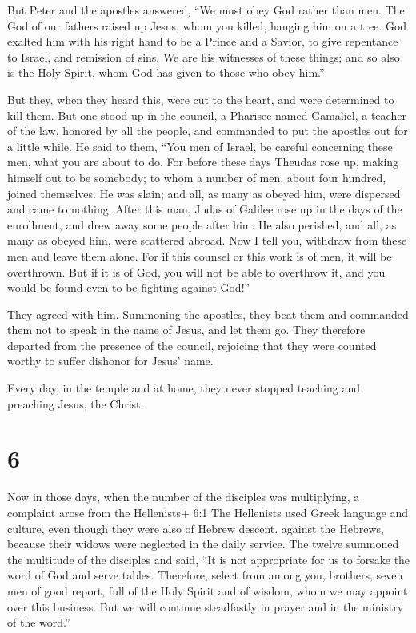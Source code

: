  But Peter and the apostles answered, ``We must obey God
rather than men.  The God of our fathers raised up Jesus,
whom you killed, hanging him on a tree.  God exalted him
with his right hand to be a Prince and a Savior, to give repentance to
Israel, and remission of sins.  We are his witnesses of
these things; and so also is the Holy Spirit, whom God has given to
those who obey him.''

 But they, when they heard this, were cut to the heart, and
were determined to kill them.  But one stood up in the
council, a Pharisee named Gamaliel, a teacher of the law, honored by all
the people, and commanded to put the apostles out for a little while.
 He said to them, ``You men of Israel, be careful
concerning these men, what you are about to do.  For before
these days Theudas rose up, making himself out to be somebody; to whom a
number of men, about four hundred, joined themselves. He was slain; and
all, as many as obeyed him, were dispersed and came to nothing.
 After this man, Judas of Galilee rose up in the days of
the enrollment, and drew away some people after him. He also perished,
and all, as many as obeyed him, were scattered abroad.  Now
I tell you, withdraw from these men and leave them alone. For if this
counsel or this work is of men, it will be overthrown.  But
if it is of God, you will not be able to overthrow it, and you would be
found even to be fighting against God!''

 They agreed with him. Summoning the apostles, they beat
them and commanded them not to speak in the name of Jesus, and let them
go.  They therefore departed from the presence of the
council, rejoicing that they were counted worthy to suffer dishonor for
Jesus' name.

 Every day, in the temple and at home, they never stopped
teaching and preaching Jesus, the Christ.

\hypertarget{section-5}{%
\section{6}\label{section-5}}

 Now in those days, when the number of the disciples was
multiplying, a complaint arose from the Hellenists+ 6:1 The Hellenists
used Greek language and culture, even though they were also of Hebrew
descent. against the Hebrews, because their widows were neglected in the
daily service.  The twelve summoned the multitude of the
disciples and said, ``It is not appropriate for us to forsake the word
of God and serve tables.  Therefore, select from among you,
brothers, seven men of good report, full of the Holy Spirit and of
wisdom, whom we may appoint over this business.  But we will
continue steadfastly in prayer and in the ministry of the word.''

